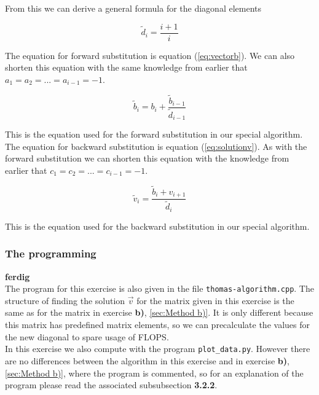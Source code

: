 \documentclass{article}
\begin{document}
    From this we can derive a general formula for the diagonal elements

    \begin{equation*}
      \tilde{d}_i = \frac{i+1}{i}
    \end{equation*}

    The equation for forward substitution is equation (\ref{eq:vectorb}). We can also shorten this equation with the same knowledge from earlier that $a_1 = a_2 = ... = a_{i-1} = -1$.

    \begin{equation*}
      \tilde{b}_i = b_i + \frac{\tilde{b}_{i-1}}{\tilde{d}_{i-1}} \label{eq:vectorbspec}
    \end{equation*}

    This is the equation used for the forward substitution in our special algorithm. \\

    The equation for backward substitution is equation (\ref{eq:solutionv}). As with the forward substitution we can shorten this equation with the knowledge from earlier that $c_1 = c_2 = ... = c_{i-1} = -1$.

    \begin{equation*}
      \tilde{v}_i = \frac{\tilde{b}_i + v_{i+1}}{\tilde{d}_i}
    \end{equation*}

    This is the equation used for the backward substitution in our special algorithm.

  \subsubsection{The programming}

  {\bf ferdig} \\

    The program for this exercise is also given in the file \texttt{thomas-algorithm.cpp}. The structure of finding the solution $\vec{v}$ for the matrix given in this exercise is the same as for the matrix in exercise \textbf{b)}, \ref{sec:Method b)}. It is only different because this matrix has predefined matrix elements, so we can precalculate the values for the new diagonal to spare usage of FLOPS. \\

    In this exercise we also compute with the program \texttt{plot\_data.py}. However there are no differences between the algorithm in this exercise and in exercise \textbf{b)}, \ref{sec:Method b)}, where the program is commented, so for an explanation of the program please read the associated subsubsection \textbf{3.2.2}. \\
\end{document}
